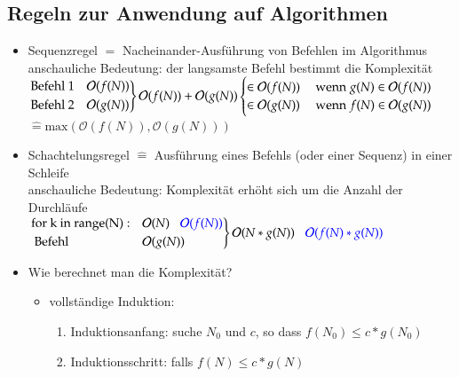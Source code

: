 \documentclass[11pt, fleqn]{scrreprt}
\newcommand{\bigO}[0]{\mathcal{O}}
\begin{document}
\subsection*{Regeln zur Anwendung auf Algorithmen}
\begin{itemize}
    \item Sequenzregel $\widehat{=}$ Nacheinander-Ausführung von Befehlen im Algorithmus \\
    anschauliche Bedeutung: der langsamste Befehl bestimmt die Komplexität \\
    $\begin{rcases}
    \text{Befehl 1} & \bigO{}(f(N)) \\
    \text{Befehl 2} & \bigO{}(g(N))\\ \end{rcases} \bigO{}(f(N)) + \bigO{}(g(N)) \begin{cases}
    \in \bigO{}(f(N)) & \text{ wenn } g(N) \in \bigO{}(f(N)) \\
    \in \bigO{}(g(N)) & \text{ wenn } f(N) \in \bigO{}(g(N)) \\ \end{cases}$ \\
    \hspace*{6.5cm} $\widehat{=} \text{max}(\bigO{}(f(N)), \bigO{}(g(N)))$
    \item Schachtelungsregel $\widehat{=}$ Ausführung eines Befehls (oder einer Sequenz) in einer Schleife \\
    anschauliche Bedeutung: Komplexität erhöht sich um die Anzahl der Durchläufe \\
    $\begin{rcases}
    \text{for k in range(N)}: & \bigO{}(N)\hspace*{3mm} \textcolor{blue}{\bigO{}(f(N))}\\
        \text{  Befehl} & \bigO{}(g(N)) \end{rcases}\bigO{}(N*g(N)) \hspace*{3mm} \textcolor{blue}{\bigO{}(f(N)*g(N))}$
        \item Wie berechnet man die Komplexität?
        \begin{itemize}
            \item vollständige Induktion:
            \begin{enumerate}
                \item Induktionsanfang: suche $N_0$ und $c$, so dass $f(N_0) \leq c*g(N_0)$
                \item Induktionsschritt: falls $f(N) \leq c*g(N)$ \\

\end{enumerate}
\end{itemize}
\end{itemize}
\end{document}
